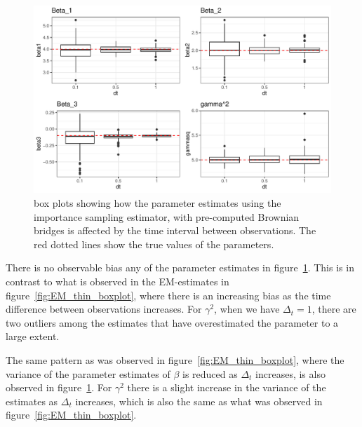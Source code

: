 \begin{figure}[H]
    \centering
    \includegraphics[width=\linewidth]{Images/Results/varying dt plot brownian bridge likelihood.pdf}
    \caption[Box plots of Parameter Estimates for various observation intervals]{box plots showing how the parameter estimates using the importance sampling estimator, with pre-computed Brownian bridges is affected by the time interval between observations. The red dotted lines show the true values of the parameters.}
    \label{fig:varying dt boxplot BB}
\end{figure}

There is no observable bias any of the parameter estimates in figure~\ref{fig:varying dt boxplot BB}. This is in contrast to what is observed in the EM-estimates in figure~\ref{fig:EM_thin_boxplot}, where there is an increasing bias as the time difference between observations increases. For $\gamma^2$, when we have $\Delta_t=1$, there are two outliers among the estimates that have overestimated the parameter to a large extent. 

The same pattern as was observed in figure~\ref{fig:EM_thin_boxplot}, where the variance of the parameter estimates of $\beta$ is reduced as $\Delta_t$ increases, is also observed in figure~\ref{fig:varying dt boxplot BB}. For $\gamma^2$ there is a slight increase in the variance of the estimates as $\Delta_t$ increases, which is also the same as what was observed in figure~\ref{fig:EM_thin_boxplot}.



